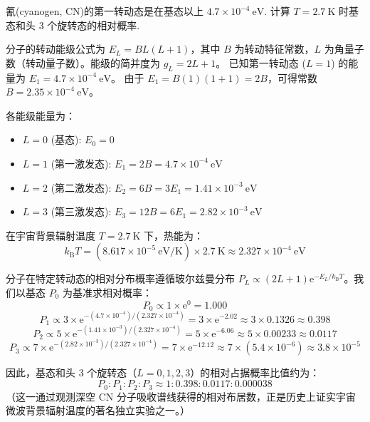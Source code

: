 \begin{exercise}\label{ex:32.4}
氰(cyanogen, CN)的第一转动态是在基态以上 $4.7 \times 10^{-4} \ \mathrm{eV}$. 计算 $T = 2.7 \ \mathrm{K}$ 时基态和头 3 个旋转态的相对概率.
\end{exercise}
\begin{solution}
分子的转动能级公式为 $E_L = B L(L+1)$，其中 $B$ 为转动特征常数，$L$ 为角量子数（转动量子数）。能级的简并度为 $g_L = 2L+1$。
已知第一转动态 ($L=1$) 的能量为 $E_1 = 4.7 \times 10^{-4} \ \mathrm{eV}$。
由于 $E_1 = B(1)(1+1) = 2B$，可得常数 $B = 2.35 \times 10^{-4} \ \mathrm{eV}$。

各能级能量为：
\begin{itemize}
    \item $L=0$ (基态): $E_0 = 0$
    \item $L=1$ (第一激发态): $E_1 = 2B = 4.7 \times 10^{-4} \ \mathrm{eV}$
    \item $L=2$ (第二激发态): $E_2 = 6B = 3 E_1 = 1.41 \times 10^{-3} \ \mathrm{eV}$
    \item $L=3$ (第三激发态): $E_3 = 12B = 6 E_1 = 2.82 \times 10^{-3} \ \mathrm{eV}$
\end{itemize}

在宇宙背景辐射温度 $T = 2.7 \ \mathrm{K}$ 下，热能为：
$$ k_{\mathrm{B}} T = (8.617 \times 10^{-5} \ \mathrm{eV/K}) \times 2.7 \ \mathrm{K} \approx 2.327 \times 10^{-4} \ \mathrm{eV} $$

分子在特定转动态的相对分布概率遵循玻尔兹曼分布 $P_L \propto (2L+1) \mathrm{e}^{-E_L / k_{\mathrm{B}} T}$。我们以基态 $P_0$ 为基准求相对概率：
$$ P_0 \propto 1 \times \mathrm{e}^0 = 1.000 $$
$$ P_1 \propto 3 \times \mathrm{e}^{-(4.7 \times 10^{-4}) / (2.327 \times 10^{-4})} = 3 \times \mathrm{e}^{-2.02} \approx 3 \times 0.1326 \approx 0.398 $$
$$ P_2 \propto 5 \times \mathrm{e}^{-(1.41 \times 10^{-3}) / (2.327 \times 10^{-4})} = 5 \times \mathrm{e}^{-6.06} \approx 5 \times 0.00233 \approx 0.0117 $$
$$ P_3 \propto 7 \times \mathrm{e}^{-(2.82 \times 10^{-3}) / (2.327 \times 10^{-4})} = 7 \times \mathrm{e}^{-12.12} \approx 7 \times (5.4 \times 10^{-6}) \approx 3.8 \times 10^{-5} $$

因此，基态和头 3 个旋转态（$L=0, 1, 2, 3$）的相对占据概率比值约为：
$$ P_0 : P_1 : P_2 : P_3 \approx 1 : 0.398 : 0.0117 : 0.000038 $$
（这一通过观测深空 CN 分子吸收谱线获得的相对布居数，正是历史上证实宇宙微波背景辐射温度的著名独立实验之一。）
\end{solution}

